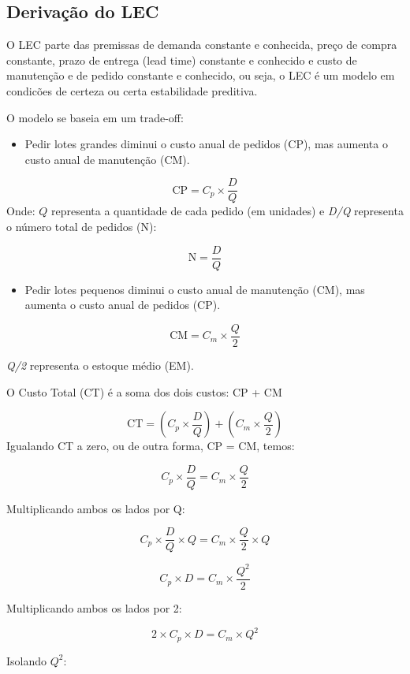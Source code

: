 \documentclass[
  a4paper,
]{book}
\providecommand{\tightlist}{%
  \setlength{\itemsep}{0pt}\setlength{\parskip}{0pt}}\usepackage{longtable,booktabs,array}
\begin{document}
\subsection{Derivação do LEC}\label{derivauxe7uxe3o-do-lec}

O LEC parte das premissas de demanda constante e conhecida, preço de
compra constante, prazo de entrega (lead time) constante e conhecido e
custo de manutenção e de pedido constante e conhecido, ou seja, o LEC é
um modelo em condicões de certeza ou certa estabilidade preditiva.

O modelo se baseia em um trade-off:

\begin{itemize}
\tightlist
\item
  Pedir lotes grandes diminui o custo anual de pedidos (CP), mas aumenta
  o custo anual de manutenção (CM).
\end{itemize}

\[
\text{CP} = C_p \times \frac{D}{Q}
\] Onde: \(Q\) representa a quantidade de cada pedido (em unidades) e
\emph{D/Q} representa o número total de pedidos (N):

\[
\text{N} = \frac{D}{Q}
\]

\begin{itemize}
\tightlist
\item
  Pedir lotes pequenos diminui o custo anual de manutenção (CM), mas
  aumenta o custo anual de pedidos (CP).
\end{itemize}

\[
\text{CM} = C_m \times \frac{Q}{2}
\]

\emph{Q/2} representa o estoque médio (EM).

O Custo Total (CT) é a soma dos dois custos: CP + CM

\[
\text{CT} = \left(C_p \times \frac{D}{Q}\right) + \left(C_m \times \frac{Q}{2}\right)
\] Igualando CT a zero, ou de outra forma, CP = CM, temos:

\[
C_p \times \frac{D}{Q} = C_m \times \frac{Q}{2}
\]

Multiplicando ambos os lados por Q:

\[
C_p \times \frac{D}{Q} \times Q = C_m \times \frac{Q}{2} \times Q
\]

\[
C_p \times D = C_m \times \frac{Q^2}{2}
\]

Multiplicando ambos os lados por 2:

\[
2 \times C_p \times D = C_m \times Q^2
\]

Isolando \(Q^2\):
\end{document}
